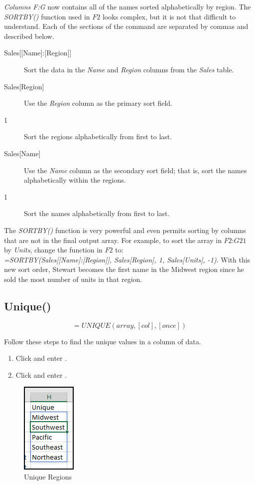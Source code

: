 \textit{Columns F:G} now contains all of the names sorted alphabetically by region. The \textit{SORTBY()} function used in $ F2 $ looks complex, but it is not that difficult to understand. Each of the sections of the command are separated by commas and described below.

\begin{description}
	\item[{Sales[[Name]:[Region]]}] \textemdash\: Sort the data in the \textit{Name} and \textit{Region} columns from the \textit{Sales} table.
	\item[{Sales[Region]}] \textemdash\: Use the \textit{Region} column as the primary sort field.
	\item[1] \textemdash\: Sort the regions alphabetically from first to last.
	\item[{Sales[Name]}] Use the \textit{Name} column as the secondary sort field; that is, sort the names alphabetically within the regions.
	\item[1] \textemdash\: Sort the names alphabetically from first to last.	
\end{description}

The \textit{SORTBY()} function is very powerful and even permits sorting by columns that are not in the final output array. For example, to sort the array in $ F2 $:$ G21 $ by \textit{Units}, change the function in $ F2 $ to:\\ \textit{=SORTBY(Sales[[Name]:[Region]], Sales[Region], 1, Sales[Units], -1)}. With this new sort order, Stewart becomes the first name in the Midwest region since he sold the most number of units in that region.

\subsection{Unique()}

\[ =UNIQUE(array,[col],[once]) \]

Follow these steps to find the unique values in a column of data.

\begin{enumbox}
	\begin{enumerate}
		\item Click  and enter .
		\item Click  and enter . 
	\end{enumerate}
\end{enumbox}

\begin{figure}[H]
	\centering
	\includegraphics{gfx/apb_fig03}
	\caption{Unique Regions}
	\label{apb:fig03}
\end{figure}


